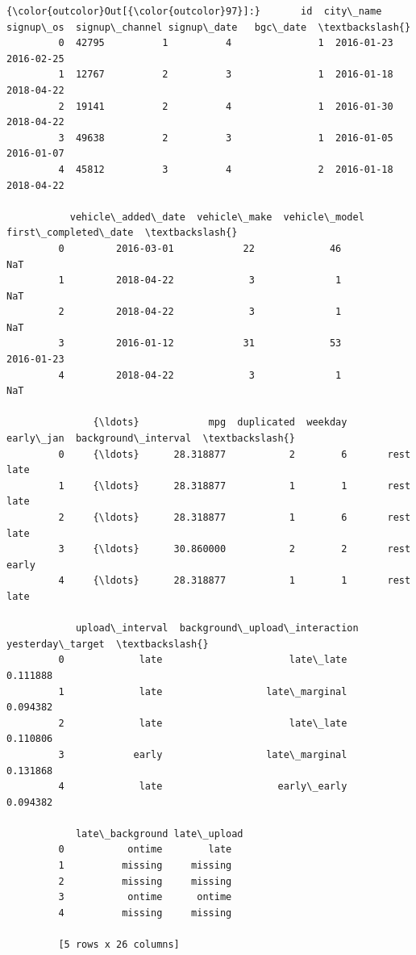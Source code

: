 \documentclass[11pt]{article}
\begin{document}
\begin{Verbatim}[commandchars=\\\{\}]
{\color{outcolor}Out[{\color{outcolor}97}]:}       id  city\_name  signup\_os  signup\_channel signup\_date   bgc\_date  \textbackslash{}
         0  42795          1          4               1  2016-01-23 2016-02-25   
         1  12767          2          3               1  2016-01-18 2018-04-22   
         2  19141          2          4               1  2016-01-30 2018-04-22   
         3  49638          2          3               1  2016-01-05 2016-01-07   
         4  45812          3          4               2  2016-01-18 2018-04-22   
         
           vehicle\_added\_date  vehicle\_make  vehicle\_model first\_completed\_date  \textbackslash{}
         0         2016-03-01            22             46                  NaT   
         1         2018-04-22             3              1                  NaT   
         2         2018-04-22             3              1                  NaT   
         3         2016-01-12            31             53           2016-01-23   
         4         2018-04-22             3              1                  NaT   
         
               {\ldots}            mpg  duplicated  weekday  early\_jan  background\_interval  \textbackslash{}
         0     {\ldots}      28.318877           2        6       rest                 late   
         1     {\ldots}      28.318877           1        1       rest                 late   
         2     {\ldots}      28.318877           1        6       rest                 late   
         3     {\ldots}      30.860000           2        2       rest                early   
         4     {\ldots}      28.318877           1        1       rest                 late   
         
            upload\_interval  background\_upload\_interaction  yesterday\_target  \textbackslash{}
         0             late                      late\_late          0.111888   
         1             late                  late\_marginal          0.094382   
         2             late                      late\_late          0.110806   
         3            early                  late\_marginal          0.131868   
         4             late                    early\_early          0.094382   
         
            late\_background late\_upload  
         0           ontime        late  
         1          missing     missing  
         2          missing     missing  
         3           ontime      ontime  
         4          missing     missing  
         
         [5 rows x 26 columns]
\end{Verbatim}
            
\end{document}
